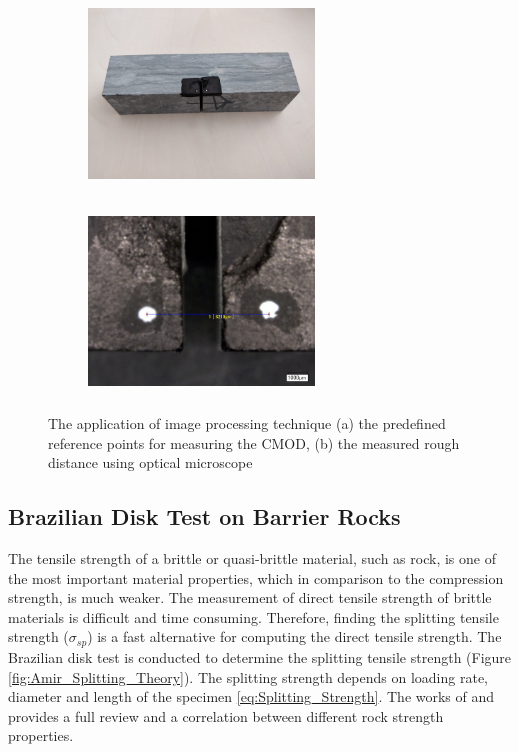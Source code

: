 \begin{figure}[!ht]
\centering
\begin{subfigure}[c]{0.48\textwidth}
\centering
\includegraphics[width=6cm,height=5cm]{figures/Amir_Fracture_Toughness_Image_a.png}
\subcaption{}
\label{fig:Amir_Fracture_Toughness_Image_a}
\end{subfigure}
\hfill
\begin{subfigure}[c]{0.48\textwidth}
\centering
\includegraphics[width=6cm,height=5cm]{figures/Amir_Fracture_Toughness_Image_b.png}
\subcaption{}
\label{fig:Amir_Fracture_Toughness_Image_b}
\end{subfigure}
\caption{The application of image processing technique (a) the predefined reference points for measuring the CMOD, (b) the measured rough distance using optical microscope}
\end{figure}



\subsection{Brazilian Disk Test on Barrier Rocks}
\label{sec:Brazilian_Disk_Exp}
The tensile strength of a brittle or quasi-brittle material, such as rock, is one of the most important material properties, which in comparison to the compression strength, is much weaker. The measurement of direct tensile strength of brittle materials is difficult and time consuming. Therefore, finding the splitting tensile strength ($\sigma_{sp}$) is a fast alternative for computing the direct tensile strength. The Brazilian disk test is conducted to determine the splitting tensile strength (Figure \ref{fig:Amir_Splitting_Theory}). The splitting strength depends on loading rate, diameter and length of the specimen \ref{eq:Splitting_Strength}. The works of \cite{Perras2014} and \cite{Li2013} provides a full review and a correlation between different rock strength properties.

